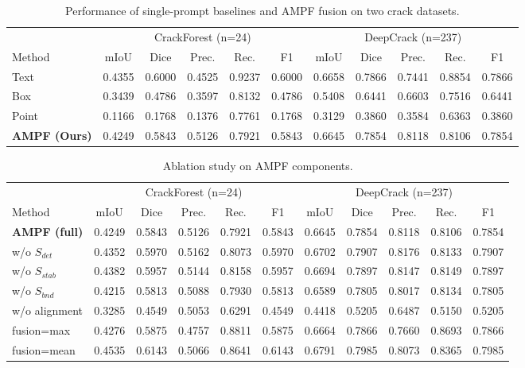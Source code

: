 
\begin{table}[htbp]
\centering
\caption{Performance of single-prompt baselines and AMPF fusion on two crack datasets.}
\label{tab:main_results}
\begin{tabular}{l|ccccc|ccccc}
\hline
& \multicolumn{5}{c|}{CrackForest (n=24)} & \multicolumn{5}{c}{DeepCrack (n=237)} \\
Method & mIoU & Dice & Prec. & Rec. & F1 & mIoU & Dice & Prec. & Rec. & F1 \\
\hline
Text & 0.4355 & 0.6000 & 0.4525 & 0.9237 & 0.6000 & 0.6658 & 0.7866 & 0.7441 & 0.8854 & 0.7866 \\
Box & 0.3439 & 0.4786 & 0.3597 & 0.8132 & 0.4786 & 0.5408 & 0.6441 & 0.6603 & 0.7516 & 0.6441 \\
Point & 0.1166 & 0.1768 & 0.1376 & 0.7761 & 0.1768 & 0.3129 & 0.3860 & 0.3584 & 0.6363 & 0.3860 \\
\textbf{AMPF (Ours)} & 0.4249 & 0.5843 & 0.5126 & 0.7921 & 0.5843 & 0.6645 & 0.7854 & 0.8118 & 0.8106 & 0.7854 \\
\hline
\end{tabular}
\end{table}

\begin{table}[htbp]
\centering
\caption{Ablation study on AMPF components.}
\label{tab:ablation}
\begin{tabular}{l|ccccc|ccccc}
\hline
& \multicolumn{5}{c|}{CrackForest (n=24)} & \multicolumn{5}{c}{DeepCrack (n=237)} \\
Method & mIoU & Dice & Prec. & Rec. & F1 & mIoU & Dice & Prec. & Rec. & F1 \\
\hline
\textbf{AMPF (full)} & 0.4249 & 0.5843 & 0.5126 & 0.7921 & 0.5843 & 0.6645 & 0.7854 & 0.8118 & 0.8106 & 0.7854 \\
w/o $S_{det}$ & 0.4352 & 0.5970 & 0.5162 & 0.8073 & 0.5970 & 0.6702 & 0.7907 & 0.8176 & 0.8133 & 0.7907 \\
w/o $S_{stab}$ & 0.4382 & 0.5957 & 0.5144 & 0.8158 & 0.5957 & 0.6694 & 0.7897 & 0.8147 & 0.8149 & 0.7897 \\
w/o $S_{bnd}$ & 0.4215 & 0.5813 & 0.5088 & 0.7930 & 0.5813 & 0.6589 & 0.7805 & 0.8017 & 0.8134 & 0.7805 \\
w/o alignment & 0.3285 & 0.4549 & 0.5053 & 0.6291 & 0.4549 & 0.4418 & 0.5205 & 0.6487 & 0.5150 & 0.5205 \\
fusion=max & 0.4276 & 0.5875 & 0.4757 & 0.8811 & 0.5875 & 0.6664 & 0.7866 & 0.7660 & 0.8693 & 0.7866 \\
fusion=mean & 0.4535 & 0.6143 & 0.5066 & 0.8641 & 0.6143 & 0.6791 & 0.7985 & 0.8073 & 0.8365 & 0.7985 \\
\hline
\end{tabular}
\end{table}

